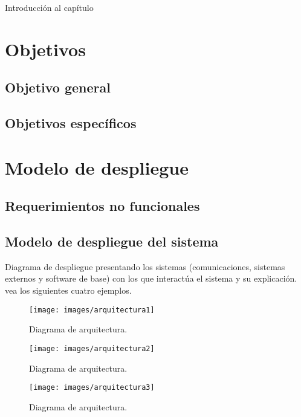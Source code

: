 Introducción al capítulo

\section{Objetivos}

\subsection{Objetivo general}

\subsection{Objetivos específicos}

\section{Modelo de despliegue}


\subsection{Requerimientos no funcionales}


\subsection{Modelo de despliegue del sistema}

Diagrama de despliegue presentando los sistemas (comunicaciones, sistemas externos y software de base) con los que interactúa el sistema y su explicación. vea los siguientes cuatro ejemplos.

	\begin{figure}[htbp!]
		\centering
			\texttt{[image: images/arquitectura1]}
		\caption{Diagrama de arquitectura.}
	\end{figure}

	\begin{figure}[htbp!]
		\centering
			\texttt{[image: images/arquitectura2]}
		\caption{Diagrama de arquitectura.}
	\end{figure}

	\begin{figure}[htbp!]
		\centering
			\texttt{[image: images/arquitectura3]}
		\caption{Diagrama de arquitectura.}
	\end{figure}

